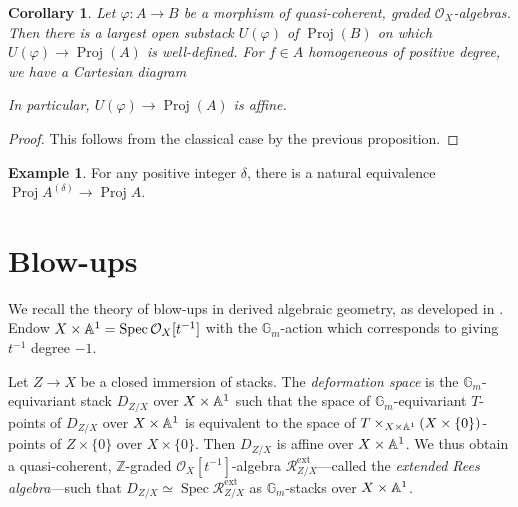 \documentclass[a4paper,twoside,11pt]{amsart}
\theoremstyle{plain}
\newtheorem{corollary}[theorem]{Corollary}
\theoremstyle{definition}
\newtheorem{example}[theorem]{Example}
\theoremstyle{remark}
\numberwithin{equation}{section}
\newcommand{\ZZ}{\mathbb{Z}} %
\newcommand{\GG}{\mathbb{G}} %
\DeclareMathOperator{\Spec}{Spec} %
\DeclareMathOperator{\Proj}{Proj} %
\newcommand{\extd}{\mathrm{ext}} %
\newcommand{\oO}{\mathcal{O}}
\newcommand{\rR}{\mathcal{R}}
\begin{document}
\begin{corollary}
\label{Cor:Proj_nat}
    Let $\varphi \colon A \to B$ be a morphism of quasi-coherent, graded $\oO_X$-algebras. Then there is a largest open substack $U(\varphi)$ of $\Proj (B)$ on which $U(\varphi) \to \Proj(A)$ is well-defined. For $f \in A$ homogeneous of positive degree, we have a Cartesian diagram
    \begin{center}
    \end{center}
    In particular, $U(\varphi) \to \Proj(A)$ is affine.
\end{corollary}

\begin{proof}
    This follows from the classical case by the previous proposition.
\end{proof}

\begin{example}
\label{Ex:Proj_delta_twist}
    For any positive integer $\delta$, there is a natural equivalence $\Proj A^{(\delta)} \to \Proj A$.
\end{example}



\section{Blow-ups}
\label{Sec:Blups}
We recall the theory of blow-ups in derived algebraic geometry, as developed in \cite{Hekking,Weil,BenBassatHekkingBlowups}. Endow $X \times \AA^1 = \Spec \oO_X[t^{-1}]$ with the $\GG_m$-action which corresponds to giving $t^{-1}$ degree $-1$.

Let $Z \to X$ be a closed immersion of stacks. The \emph{deformation space}  is the $\GG_m$-equivariant stack $D_{Z/X}$ over $X \times \AA^1$ such that the space of $\GG_m$-equivariant $T$-points of $D_{Z/X}$ over $X \times \AA^1$ is equivalent to the space of $T \times_{X \times \AA^1} (X \times \{0\})$-points of $Z \times\{0\}$ over $X \times \{0\}$. Then $D_{Z/X}$ is affine over $X \times \AA^1$. We thus obtain a quasi-coherent, $\ZZ$-graded $\oO_X[t^{-1}]$-algebra $\rR_{Z/X}^{\extd}$---called the \emph{extended Rees algebra}---such that $D_{Z/X} \simeq \Spec \rR_{Z/X}^{\extd} $ as $\GG_m$-stacks over $X \times \AA^1$.
\end{document}
